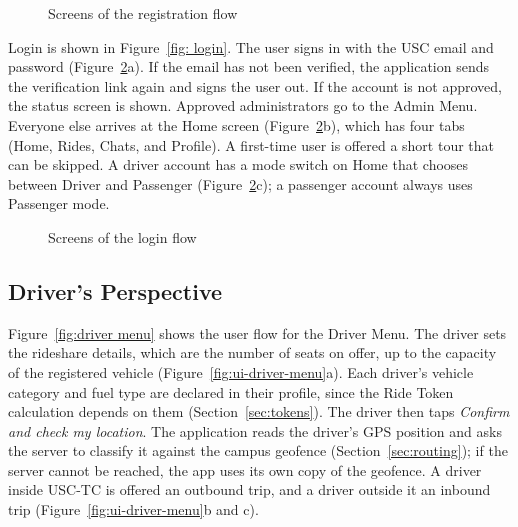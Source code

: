 
    \begin{figure}[htbp]
        \centering
        \hfill
        \hfill
        \hfill
        \caption{Screens of the registration flow}
        \label{fig:ui-register}
    \end{figure}

Login is shown in Figure~\ref{fig: login}. The user signs in with the USC email and password (Figure~\ref{fig:ui-login}a). If the email has not been verified, the application sends the verification link again and signs the user out. If the account is not approved, the status screen is shown. Approved administrators go to the Admin Menu. Everyone else arrives at the Home screen (Figure~\ref{fig:ui-login}b), which has four tabs (Home, Rides, Chats, and Profile). A first-time user is offered a short tour that can be skipped. A driver account has a mode switch on Home that chooses between Driver and Passenger (Figure~\ref{fig:ui-login}c); a passenger account always uses Passenger mode.


    \begin{figure}[htbp]
        \centering
        \hfill
        \hfill
        \caption{Screens of the login flow}
        \label{fig:ui-login}
    \end{figure}

\subsection{Driver's Perspective}
\label{sec:flow-driver}
Figure~\ref{fig:driver menu} shows the user flow for the Driver Menu. The driver sets the rideshare details, which are the number of seats on offer, up to the capacity of the registered vehicle (Figure~\ref{fig:ui-driver-menu}a). Each driver's vehicle category and fuel type are declared in their profile, since the Ride Token calculation depends on them (Section~\ref{sec:tokens}). The driver then taps \emph{Confirm and check my location}. The application reads the driver's GPS position and asks the server to classify it against the campus geofence (Section~\ref{sec:routing}); if the server cannot be reached, the app uses its own copy of the geofence. A driver inside USC-TC is offered an outbound trip, and a driver outside it an inbound trip (Figure~\ref{fig:ui-driver-menu}b and c).

